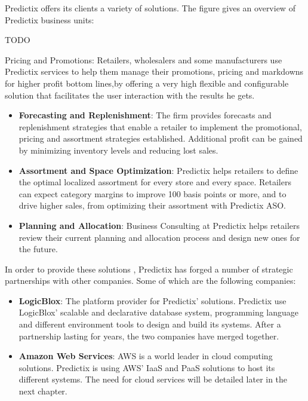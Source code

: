 Predictix offers its clients a variety of solutions. The figure gives an
overview of Predictix business units:

TODO

Pricing and Promotions: Retailers, wholesalers and some manufacturers use
Predictix services to help them manage their promotions, pricing and markdowns
for higher profit bottom lines,by offering a very high flexible and
configurable solution that facilitates the user interaction with the results he
gets.

\begin{itemize}
\item{\textbf{Forecasting  and Replenishment}: The firm provides forecasts and
    replenishment strategies that enable a retailer to implement the
    promotional, pricing and assortment strategies established. Additional
    profit can be gained by minimizing inventory levels and reducing lost
    sales.}

\item{\textbf{Assortment and Space Optimization}: Predictix helps retailers to
    define the optimal localized assortment for every store and every space.
    Retailers can expect category margins to improve 100 basis points or more,
    and to drive higher sales, from optimizing their assortment with Predictix
    ASO.}
\item{\textbf{Planning and  Allocation}: Business Consulting at Predictix helps
    retailers review their current planning and allocation process and design
    new ones for the future.}
\end{itemize}

\noindent In order to provide these solutions , Predictix has forged a number of
strategic partnerships with other companies. Some of which are the following
companies:

\begin{itemize}
  \item{\textbf{LogicBlox}: The platform provider for Predictix' solutions. Predictix use
LogicBlox' scalable and declarative database system, programming language and
different environment tools to design and build  its systems. After a
partnership lasting for years, the two companies have merged together.}

\item{\textbf{Amazon Web Services}: AWS is a world leader in cloud computing
solutions. Predictix is using AWS' IaaS and PaaS solutions to host its different
systems. The need for cloud services will be detailed later in the next chapter.}
\end{itemize}

